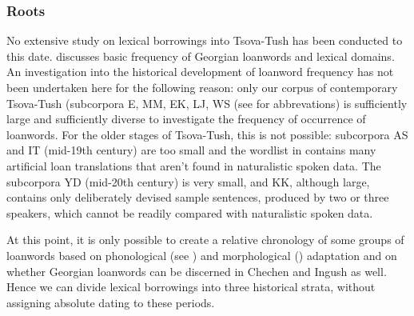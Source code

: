 \subsubsection{Roots} \label{loanwordsconcl}

No extensive study on lexical borrowings into Tsova-Tush has been conducted to this date. \textcite{WS} discusses basic frequency of Georgian loanwords and lexical domains. An investigation into the historical development of loanword frequency has not been undertaken here for the following reason: only our corpus of contemporary Tsova-Tush (subcorpora E, MM, EK, LJ, WS (see  for abbrevations) is sufficiently large and sufficiently diverse to investigate the frequency of occurrence of loanwords. For the older stages of Tsova-Tush, this is not possible: subcorpora AS and IT (mid-19th century) are too small and the wordlist in \textcite{tsiskarovgloss} contains many artificial loan translations that aren't found in naturalistic spoken data. The subcorpora YD (mid-20th century) is very small, and KK, although large, contains only deliberately devised sample sentences, produced by two or three speakers, which cannot be readily compared with naturalistic spoken data.


At this point, it is only possible to create a relative chronology of some groups of loanwords based on phonological (see ) and morphological () adaptation and on whether Georgian loanwords can be discerned in Chechen and Ingush as well. Hence we can divide lexical borrowings into three historical strata, without assigning absolute dating to these periods.

